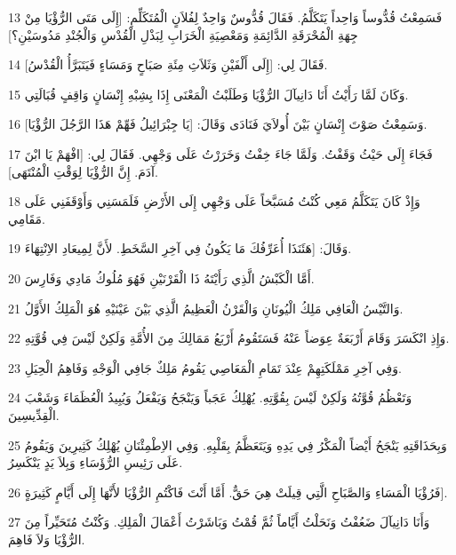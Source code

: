 \par 13 فَسَمِعْتُ قُدُّوساً وَاحِداً يَتَكَلَّمُ. فَقَالَ قُدُّوسٌ وَاحِدٌ لِفُلاَنٍ الْمُتَكَلِّمِ: [إِلَى مَتَى الرُّؤْيَا مِنْ جِهَةِ الْمُحْرَقَةِ الدَّائِمَةِ وَمَعْصِيَةِ الْخَرَابِ لِبَذْلِ الْقُدْسِ وَالْجُنْدِ مَدُوسَيْنِ؟]
\par 14 فَقَالَ لِي: [إِلَى أَلْفَيْنِ وَثَلاَثِ مِئَةِ صَبَاحٍ وَمَسَاءٍ فَيَتَبَرَّأُ الْقُدْسُ].
\par 15 وَكَانَ لَمَّا رَأَيْتُ أَنَا دَانِيآلَ الرُّؤْيَا وَطَلَبْتُ الْمَعْنَى إِذَا بِشِبْهِ إِنْسَانٍ وَاقِفٍ قُبَالَتِي.
\par 16 وَسَمِعْتُ صَوْتَ إِنْسَانٍ بَيْنَ أُولاَيَ فَنَادَى وَقَالَ: [يَا جِبْرَائِيلُ فَهِّمْ هَذَا الرَّجُلَ الرُّؤْيَا].
\par 17 فَجَاءَ إِلَى حَيْثُ وَقَفْتُ. وَلَمَّا جَاءَ خِفْتُ وَخَرَرْتُ عَلَى وَجْهِي. فَقَالَ لِي: [افْهَمْ يَا ابْنَ آدَمَ. إِنَّ الرُّؤْيَا لِوَقْتِ الْمُنْتَهَى].
\par 18 وَإِذْ كَانَ يَتَكَلَّمُ مَعِي كُنْتُ مُسَبَّخاً عَلَى وَجْهِي إِلَى الأَرْضِ فَلَمَسَنِي وَأَوْقَفَنِي عَلَى مَقَامِي.
\par 19 وَقَالَ: [هَئَنَذَا أُعَرِّفُكَ مَا يَكُونُ فِي آخِرِ السَّخَطِ. لأَنَّ لِمِيعَادِ الاِنْتِهَاءَ.
\par 20 أَمَّا الْكَبْشُ الَّذِي رَأَيْتَهُ ذَا الْقَرْنَيْنِ فَهُوَ مُلُوكُ مَادِي وَفَارِسَ.
\par 21 وَالتَّيْسُ الْعَافِي مَلِكُ الْيُونَانِ وَالْقَرْنُ الْعَظِيمُ الَّذِي بَيْنَ عَيْنَيْهِ هُوَ الْمَلِكُ الأَوَّلُ.
\par 22 وَإِذِ انْكَسَرَ وَقَامَ أَرْبَعَةٌ عِوَضاً عَنْهُ فَسَتَقُومُ أَرْبَعُ مَمَالِكَ مِنَ الأُمَّةِ وَلَكِنْ لَيْسَ فِي قُوَّتِهِ.
\par 23 وَفِي آخِرِ مَمْلَكَتِهِمْ عِنْدَ تَمَامِ الْمَعَاصِي يَقُومُ مَلِكٌ جَافِي الْوَجْهِ وَفَاهِمُ الْحِيَلِ.
\par 24 وَتَعْظُمُ قُوَّتُهُ وَلَكِنْ لَيْسَ بِقُوَّتِهِ. يُهْلِكُ عَجَباً وَيَنْجَحُ وَيَفْعَلُ وَيُبِيدُ الْعُظَمَاءَ وَشَعْبَ الْقِدِّيسِينَ.
\par 25 وَبِحَذَاقَتِهِ يَنْجَحُ أَيْضاً الْمَكْرُ فِي يَدِهِ وَيَتَعَظَّمُ بِقَلْبِهِ. وَفِي الاِطْمِئْنَانِ يُهْلِكُ كَثِيرِينَ وَيَقُومُ عَلَى رَئِيسِ الرُّؤَسَاءِ وَبِلاَ يَدٍ يَنْكَسِرُ.
\par 26 فَرُؤْيَا الْمَسَاءِ وَالصَّبَاحِ الَّتِي قِيلَتْ هِيَ حَقٌّ. أَمَّا أَنْتَ فَاكْتُمِ الرُّؤْيَا لأَنَّهَا إِلَى أَيَّامٍ كَثِيرَةٍ].
\par 27 وَأَنَا دَانِيآلَ ضَعُفْتُ وَنَحَلْتُ أَيَّاماً ثُمَّ قُمْتُ وَبَاشَرْتُ أَعْمَالَ الْمَلِكِ. وَكُنْتُ مُتَحَيِّراً مِنَ الرُّؤْيَا وَلاَ فَاهِمَ.

